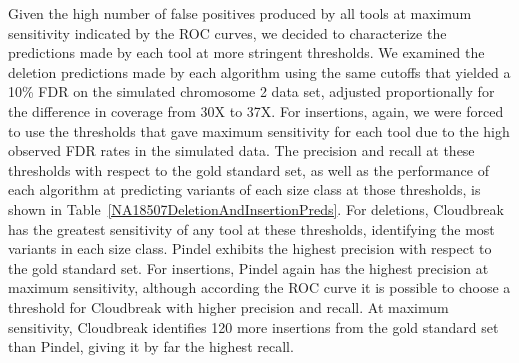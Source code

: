 Given the high number of false positives produced by all tools at maximum sensitivity indicated by the ROC curves, we decided to characterize the predictions made by each tool at more stringent thresholds. We examined the deletion predictions made by each algorithm using the same cutoffs that yielded a 10\% FDR on the simulated chromosome 2 data set, adjusted proportionally for the difference in coverage from 30X to 37X. For insertions, again, we were forced to use the thresholds that gave maximum sensitivity for each tool due to the high observed FDR rates in the simulated data. The precision and recall at these thresholds with respect to the gold standard set, as well as the performance of each algorithm at predicting variants of each size class at those thresholds, is shown in Table~\ref{NA18507DeletionAndInsertionPreds}. For deletions, Cloudbreak has the greatest sensitivity of any tool at these thresholds, identifying the most variants in each size class. Pindel exhibits the highest precision with respect to the gold standard set. For insertions, Pindel again has the highest precision at maximum sensitivity, although according the ROC curve it is possible to choose a threshold for Cloudbreak with higher precision and recall. At maximum sensitivity, Cloudbreak identifies 120 more insertions from the gold standard set than Pindel, giving it by far the highest recall.

